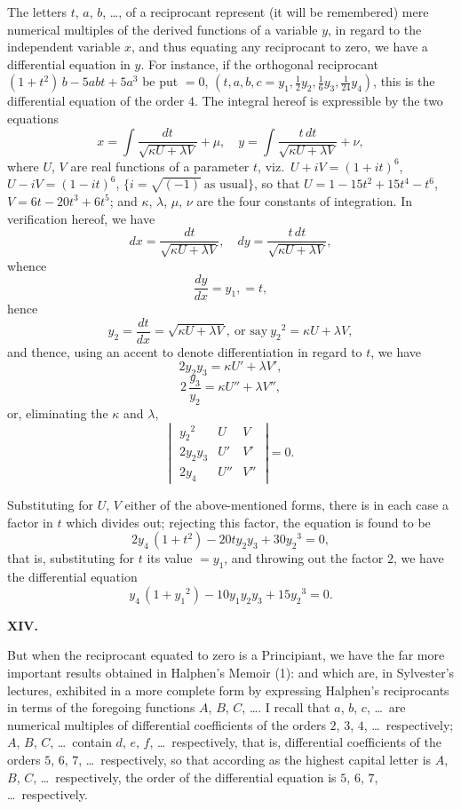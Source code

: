 \documentclass[11pt]{article}
\begin{document}
The letters $t$, $a$, $b$, \ldots, of a reciprocant represent (it will be remembered) mere numerical multiples of the derived functions of a variable $y$, in regard to the independent variable $x$, and thus equating any reciprocant to zero, we have a differential equation in $y$. For instance, if the orthogonal reciprocant $(1 + t^2)\,b - 5 a b t + 5 a^3$ be put $= 0$, $(t, a, b, c = y_1, \tfrac{1}{2} y_2, \tfrac{1}{6} y_3, \tfrac{1}{24} y_4)$, this is the differential equation of the order $4$. The integral hereof is expressible by the two equations
\[
x = \int\frac{dt}{\sqrt{\kappa U + \lambda V}} + \mu,\quad y = \int\frac{t\,dt}{\sqrt{\kappa U + \lambda V}} + \nu,
\]
where $U$, $V$ are real functions of a parameter $t$, viz.\ $U + i V = (1 + i t)^6$, $U - i V = (1 - i t)^6$, $\{i = \sqrt{(-1)}\ \text{as usual}\}$, so that $U = 1 - 15 t^2 + 15 t^4 - t^6$, $V = 6 t - 20 t^3 + 6 t^5$; and $\kappa$, $\lambda$, $\mu$, $\nu$ are the four constants of integration. In verification hereof, we have
\[
dx = \frac{dt}{\sqrt{\kappa U + \lambda V}},\quad dy = \frac{t\,dt}{\sqrt{\kappa U + \lambda V}},
\]
whence
\[
\frac{dy}{dx} = y_1, = t,
\]
hence
\[
y_2 = \frac{dt}{dx} = \sqrt{\kappa U + \lambda V},\ \text{or say}\ y_2{}^2 = \kappa U + \lambda V,
\]
and thence, using an accent to denote differentiation in regard to $t$, we have
\[
2 y_2 y_3 = \kappa U' + \lambda V',
\]
\[
2\,\frac{y_3}{y_2} = \kappa U'' + \lambda V'',
\]
or, eliminating the $\kappa$ and $\lambda$,
\[
\left|\;\begin{array}{ccc}
y_2{}^2 & U & V \\
2 y_2 y_3 & U' & V' \\
2 y_4 & U'' & V''
\end{array}\;\right| = 0.
\]

Substituting for $U$, $V$ either of the above-mentioned forms, there is in each case a factor in $t$ which divides out; rejecting this factor, the equation is found to be
\[
2 y_4\,(1 + t^2) - 20 t y_2 y_3 + 30 y_2{}^3 = 0,
\]
that is, substituting for $t$ its value $= y_1$, and throwing out the factor $2$, we have the differential equation
\[
y_4\,(1 + y_1{}^2) - 10 y_1 y_2 y_3 + 15 y_2{}^3 = 0.
\]

\medskip
\begin{center}\textbf{XIV.}\end{center}

But when the reciprocant equated to zero is a Principiant, we have the far more important results obtained in Halphen's Memoir (1): and which are, in Sylvester's lectures, exhibited in a more complete form by expressing Halphen's reciprocants in terms of the foregoing functions $A$, $B$, $C$, \ldots. I recall that $a$, $b$, $c$, \ldots\ are numerical multiples of differential coefficients of the orders $2$, $3$, $4$, \ldots\ respectively; $A$, $B$, $C$, \ldots\ contain $d$, $e$, $f$, \ldots\ respectively, that is, differential coefficients of the orders $5$, $6$, $7$, \ldots\ respectively, so that according as the highest capital letter is $A$, $B$, $C$, \ldots\ respectively, the order of the differential equation is $5$, $6$, $7$, \ldots\ respectively.
\end{document}
